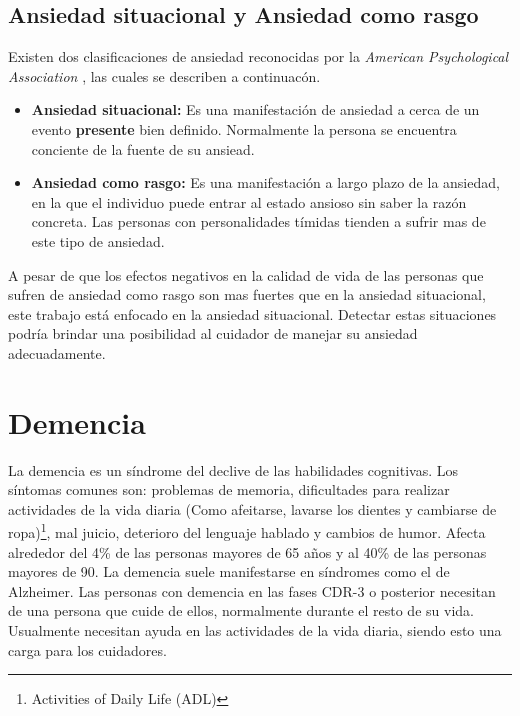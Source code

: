\subsection{Ansiedad situacional y Ansiedad como rasgo}\label{secc:anxieystatevstrait}
Existen dos clasificaciones de ansiedad reconocidas por la \textit{American Psychological Association} \citep{psychologyapa} , las cuales se describen a continuac\'on.

\begin{itemize}
	\item{\textbf{Ansiedad situacional:}} Es una manifestaci\'on de ansiedad a cerca de un evento \textbf{presente} bien definido. Normalmente la persona se encuentra conciente de la fuente de su ansiead. 
	\item{\textbf{Ansiedad como rasgo:}} Es una manifestaci\'on a largo plazo de la ansiedad, en la que el individuo puede entrar al estado ansioso sin saber la raz\'on concreta. Las personas con personalidades t\'imidas tienden a sufrir mas de este tipo de ansiedad.

\end{itemize}

A pesar de que los efectos negativos en la calidad de vida de las personas que sufren de ansiedad como rasgo son mas fuertes que en la ansiedad situacional, este trabajo est\'a enfocado en la ansiedad situacional. Detectar estas situaciones podr\'ia brindar una posibilidad al cuidador de manejar su ansiedad adecuadamente.
\section{Demencia}\label{secc:dementia}
La demencia es un s\'indrome del declive de las habilidades cognitivas. Los s\'intomas comunes son: problemas de memoria, dificultades para realizar actividades de la vida diaria (Como afeitarse, lavarse los dientes y cambiarse de ropa)\footnote{Activities of Daily Life (ADL)}, mal juicio, deterioro del lenguaje hablado y cambios de humor\citep{Aziz}. Afecta alrededor del 4\% de las personas mayores de 65 a\~nos y al 40\% de las personas mayores de 90. La demencia suele manifestarse en s\'indromes como el de Alzheimer. Las personas con demencia en las fases CDR-3 o posterior necesitan de una persona que cuide de ellos, normalmente durante el resto de su vida. Usualmente necesitan ayuda en las actividades de la vida diaria, siendo esto una carga para los cuidadores.

